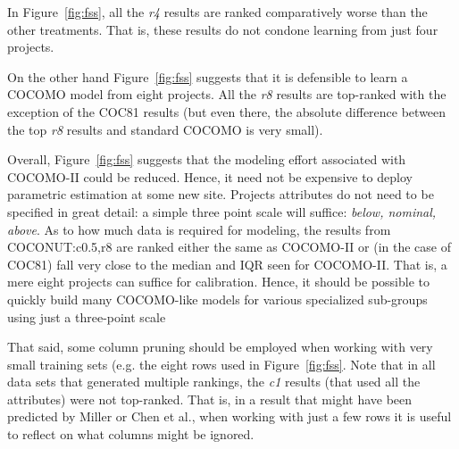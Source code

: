 \documentclass[smallcondesed]{svjour3}
\newcommand{\fig}[1]{Figure~\ref{fig:#1}}
\begin{document}
In \fig{fss}, all the {\em r4} results are ranked
comparatively worse than the other treatments.  That
is, these results do not condone learning from just
four projects.

On the other hand \fig{fss} suggests that it is defensible
to learn a COCOMO model from eight projects. All the
{\em r8} results are top-ranked with the exception
of the COC81 results (but even there, the absolute
difference between the top {\em r8} results and
standard COCOMO is very small).

Overall, \fig{fss} suggests that the modeling
effort associated with COCOMO-II could be reduced. Hence,
it need not be expensive to deploy parametric estimation
at some new site.
Projects attributes
do not need to be specified in great detail:
a simple three point scale will suffice:
 {\em below, nominal, above}. As to how much data is
required for modeling, 
the results
from COCONUT:c0.5,r8 are ranked either the same as
COCOMO-II or (in the case of COC81) fall very close
to the median and IQR seen for COCOMO-II.
That is, 
a mere eight projects can
suffice for calibration.
Hence, it
should be possible to quickly build many COCOMO-like
models for various specialized sub-groups using just
a three-point scale

That said, some column pruning should be employed
when working with very small training sets (e.g.
the eight rows used in \fig{fss}. 
Note that
in all data sets that generated multiple rankings,
the {\em c1} results (that used all the attributes)
were not top-ranked. That is, in a result that might
have been predicted by Miller or Chen et al., when
working with just a few rows it is useful to
reflect on what columns might be ignored.
\end{document}
